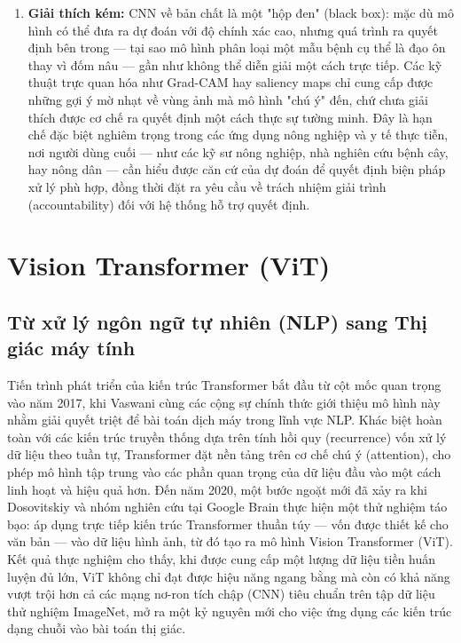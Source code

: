 \begin{enumerate}[leftmargin=1.5cm]
    \item \textbf{Giải thích kém:} CNN về bản chất là một "hộp đen" (black box): mặc dù mô hình có thể đưa ra dự đoán với độ chính xác cao, nhưng quá trình ra quyết định bên trong — tại sao mô hình phân loại một mẫu bệnh cụ thể là đạo ôn thay vì đốm nâu — gần như không thể diễn giải một cách trực tiếp. Các kỹ thuật trực quan hóa như Grad-CAM hay saliency maps chỉ cung cấp được những gợi ý mờ nhạt về vùng ảnh mà mô hình "chú ý" đến, chứ chưa giải thích được cơ chế ra quyết định một cách thực sự tường minh. Đây là hạn chế đặc biệt nghiêm trọng trong các ứng dụng nông nghiệp và y tế thực tiễn, nơi người dùng cuối — như các kỹ sư nông nghiệp, nhà nghiên cứu bệnh cây, hay nông dân — cần hiểu được căn cứ của dự đoán để quyết định biện pháp xử lý phù hợp, đồng thời đặt ra yêu cầu về trách nhiệm giải trình (accountability) đối với hệ thống hỗ trợ quyết định.
\end{enumerate}

\section{Vision Transformer (ViT)}

\subsection{Từ xử lý ngôn ngữ tự nhiên (NLP) sang Thị giác máy tính}

Tiến trình phát triển của kiến trúc Transformer bắt đầu từ cột mốc quan trọng vào năm 2017, khi Vaswani cùng các cộng sự chính thức giới thiệu mô hình này nhằm giải quyết triệt để bài toán dịch máy trong lĩnh vực NLP. Khác biệt hoàn toàn với các kiến trúc truyền thống dựa trên tính hồi quy (recurrence) vốn xử lý dữ liệu theo tuần tự, Transformer đặt nền tảng trên cơ chế chú ý (attention), cho phép mô hình tập trung vào các phần quan trọng của dữ liệu đầu vào một cách linh hoạt và hiệu quả hơn. Đến năm 2020, một bước ngoặt mới đã xảy ra khi Dosovitskiy và nhóm nghiên cứu tại Google Brain thực hiện một thử nghiệm táo bạo: áp dụng trực tiếp kiến trúc Transformer thuần túy — vốn được thiết kế cho văn bản — vào dữ liệu hình ảnh, từ đó tạo ra mô hình Vision Transformer (ViT). Kết quả thực nghiệm cho thấy, khi được cung cấp một lượng dữ liệu tiền huấn luyện đủ lớn, ViT không chỉ đạt được hiệu năng ngang bằng mà còn có khả năng vượt trội hơn cả các mạng nơ-ron tích chập (CNN) tiêu chuẩn trên tập dữ liệu thử nghiệm ImageNet, mở ra một kỷ nguyên mới cho việc ứng dụng các kiến trúc dạng chuỗi vào bài toán thị giác.
\newpage
